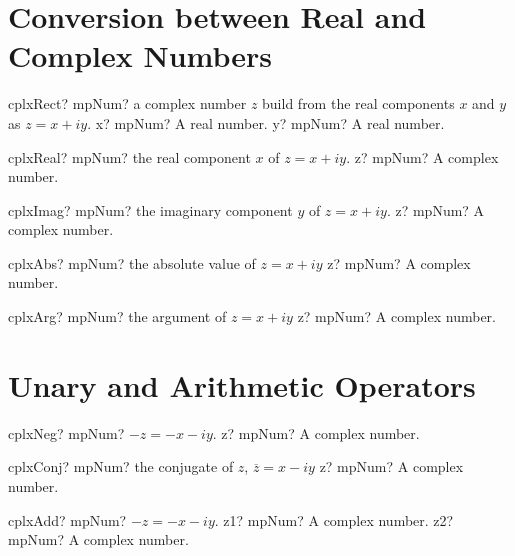 \documentclass[12pt,a4paper,openany]{book}
\begin{document}
\section{Conversion between Real and Complex Numbers}

\begin{mpFunctionsExtract}
\mpFunctionTwo
{cplxRect? mpNum? a complex number $z$ build from the real components $x$ and $y$ as $z=x+iy$.}
{x? mpNum? A real number.}
{y? mpNum? A real number.}
\end{mpFunctionsExtract}

\begin{mpFunctionsExtract}
\mpFunctionOne
{cplxReal? mpNum? the real component $x$ of $z=x+iy$.}
{z? mpNum? A complex number.}
\end{mpFunctionsExtract}

\begin{mpFunctionsExtract}
\mpFunctionOne
{cplxImag? mpNum? the imaginary component $y$ of $z=x+iy$.}
{z? mpNum? A complex number.}
\end{mpFunctionsExtract}

\begin{mpFunctionsExtract}
\mpFunctionOne
{cplxAbs? mpNum? the absolute value of $z=x+iy$}
{z? mpNum? A complex number.}
\end{mpFunctionsExtract}

\begin{mpFunctionsExtract}
\mpFunctionOne
{cplxArg? mpNum? the argument of $z=x+iy$}
{z? mpNum? A complex number.}
\end{mpFunctionsExtract}

\section{Unary and Arithmetic Operators }

\begin{mpFunctionsExtract}
\mpFunctionOne
{cplxNeg? mpNum?  $-z=-x-iy$.}
{z? mpNum? A complex number.}
\end{mpFunctionsExtract}

\begin{mpFunctionsExtract}
\mpFunctionOne
{cplxConj? mpNum? the conjugate of $z$, $\overline{z}=x-iy$}
{z? mpNum? A complex number.}
\end{mpFunctionsExtract}

\begin{mpFunctionsExtract}
\mpFunctionTwo
{cplxAdd? mpNum?  $-z=-x-iy$.}
{z1? mpNum? A complex number.}
{z2? mpNum? A complex number.}
\end{mpFunctionsExtract}
\end{document}
